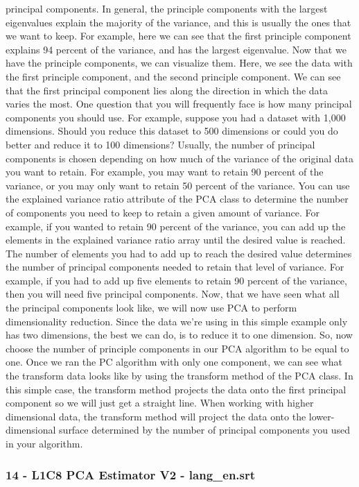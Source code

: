 principal components. In general, the principle components with the
largest eigenvalues explain the majority of the variance, and this is
usually the ones that we want to keep. For example, here we can see that
the first principle component explains 94 percent of the variance, and
has the largest eigenvalue. Now that we have the principle components,
we can visualize them. Here, we see the data with the first principle
component, and the second principle component. We can see that the first
principal component lies along the direction in which the data varies
the most. One question that you will frequently face is how many
principal components you should use. For example, suppose you had a
dataset with 1,000 dimensions. Should you reduce this dataset to 500
dimensions or could you do better and reduce it to 100 dimensions?
Usually, the number of principal components is chosen depending on how
much of the variance of the original data you want to retain. For
example, you may want to retain 90 percent of the variance, or you may
only want to retain 50 percent of the variance. You can use the
explained variance ratio attribute of the PCA class to determine the
number of components you need to keep to retain a given amount of
variance. For example, if you wanted to retain 90 percent of the
variance, you can add up the elements in the explained variance ratio
array until the desired value is reached. The number of elements you had
to add up to reach the desired value determines the number of principal
components needed to retain that level of variance. For example, if you
had to add up five elements to retain 90 percent of the variance, then
you will need five principal components. Now, that we have seen what all
the principal components look like, we will now use PCA to perform
dimensionality reduction. Since the data we're using in this simple
example only has two dimensions, the best we can do, is to reduce it to
one dimension. So, now choose the number of principle components in our
PCA algorithm to be equal to one. Once we ran the PC algorithm with only
one component, we can see what the transform data looks like by using
the transform method of the PCA class. In this simple case, the
transform method projects the data onto the first principal component so
we will just get a straight line. When working with higher dimensional
data, the transform method will project the data onto the
lower-dimensional surface determined by the number of principal
components you used in your algorithm.

\hypertarget{l1c8-pca-estimator-v2---lang_en.srt}{%
\subsubsection{14 - L1C8 PCA Estimator V2 -
lang\_en.srt}\label{l1c8-pca-estimator-v2---lang_en.srt}}

